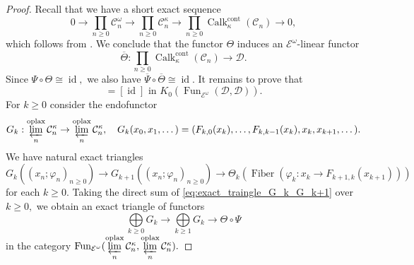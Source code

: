 \documentclass[11pt,leqno]{amsart}
\numberwithin{equation}{section}
\newcommand{\prolim}[1][]{\mathop{\varprojlim}\limits_{#1}}
\newcommand{\biggplus}[1][]{\mathop{\bigoplus}\limits_{#1}}
\newcommand{\prodd}[1][]{\mathop{\prod}\limits_{#1}}
\newcommand{\bbar}{\overline}
\newcommand{\oplax}{\operatorname{oplax}}
\newcommand{\Fiber}{\operatorname{Fiber}}
\newcommand{\cont}{\operatorname{cont}}
\newcommand{\cD}{{\mathcal D}}
\newcommand{\cC}{{\mathcal C}}
\newcommand{\cE}{{\mathcal E}}
\newcommand{\Fun}{\operatorname{Fun}}
\newcommand{\Calk}{\operatorname{Calk}}
\newcommand{\id}{\operatorname{id}}
\begin{document}
\begin{proof}
Recall that we have a short exact sequence
\begin{equation*}
0\to \prodd[n\geq 0]\cC_n^{\omega}\to \prodd[n\geq 0]\cC_n^{\kappa}\to \prodd[n\geq 0]\Calk_{\kappa}^{\cont}(\cC_n)\to 0,
\end{equation*}
which follows from \cite[Lemma 5.2]{KW19}. We conclude that the functor $\Theta$ induces an $\cE^{\omega}$-linear functor
\begin{equation*}
\bbar{\Theta}:\prodd[n\geq 0]\Calk_{\kappa}^{\cont}(\cC_n)\to \cD.
\end{equation*}
Since $\Psi\circ\Theta\cong\id,$ we also have $\bbar{\Psi}\circ\bbar{\Theta}\cong \id.$ It remains to prove that
\begin{equation}
[\bbar{\Theta}\circ\bbar{\Psi}]=[\id]\text{ in }K_0(\Fun_{\cE^{\omega}}(\cD,\cD)).
\end{equation}
For $k\geq 0$ consider the endofunctor 
\begin{equation*}
G_k:\prolim[n]^{\oplax}\cC_n^{\kappa}\to\prolim[n]^{\oplax}\cC_n^{\kappa},\quad G_k(x_0,x_1,\dots)=(F_{k,0}(x_k),\dots,F_{k,k-1}(x_k),x_k,x_{k+1},\dots).
\end{equation*}
We have natural exact triangles
\begin{equation}\label{eq:exact_traingle_G_k_G_k+1}
G_k((x_n;\varphi_n)_{n\geq 0})\to G_{k+1}((x_n;\varphi_n)_{n\geq 0})\to \Theta_k(\Fiber(\varphi_k:x_k\to F_{k+1,k}(x_{k+1})))
\end{equation}
for each $k\geq 0.$ Taking the direct sum of \eqref{eq:exact_traingle_G_k_G_k+1} over $k\geq 0,$ we obtain an exact triangle of functors
\begin{equation}\label{eq:exact_traingle_sum_G_k}
\biggplus[k\geq 0] G_k\to \biggplus[k\geq 1] G_k\to \Theta\circ\Psi
\end{equation}
in the category $\Fun_{\cE^{\omega}}(\prolim[n]^{\oplax}\cC_n^{\kappa},\prolim[n]^{\oplax}\cC_n^{\kappa}).$


\end{proof}
\end{document}
